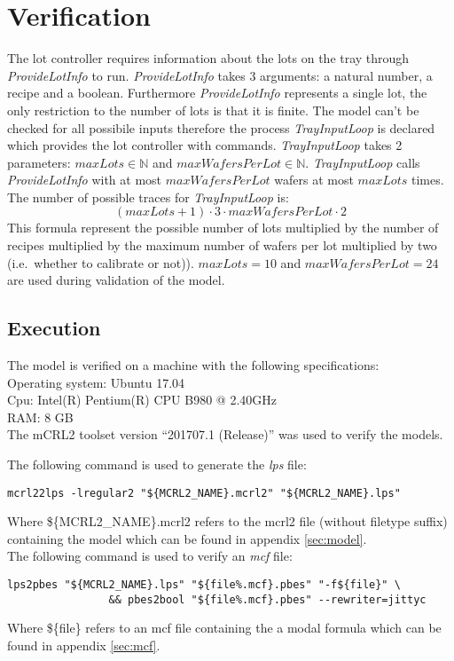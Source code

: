 \section{Verification}\label{sec:results}
The lot controller requires information about the lots on the tray through \textit{ProvideLotInfo} to run.
\textit{ProvideLotInfo} takes 3 arguments: a natural number, a recipe and a boolean.
Furthermore \textit{ProvideLotInfo} represents a single lot, the only restriction to the number of lots is that it is finite.
The model can't be checked for all possibile inputs therefore the process \textit{TrayInputLoop} is declared which provides the lot controller with  commands.
\textit{TrayInputLoop} takes 2 parameters: $\mathit{maxLots} \in \mathbb{N}$ and $\mathit{maxWafersPerLot} \in \mathbb{N}$.
\textit{TrayInputLoop} calls \textit{ProvideLotInfo} with at most $\mathit{maxWafersPerLot}$ wafers at most $\mathit{maxLots}$ times.
The number of possible traces for \textit{TrayInputLoop} is:
$$(\mathit{maxLots}+1) \cdot 3 \cdot \mathit{maxWafersPerLot} \cdot 2$$
This formula represent the possible number of lots multiplied by the number of recipes multiplied by the maximum number of wafers per lot multiplied by two (i.e.\ whether to calibrate or not)). $\mathit{maxLots} = 10$ and $\mathit{maxWafersPerLot} = 24$ are used during validation of the model.

\subsection{Execution}
The model is verified on a machine with the following specifications:\\
Operating system: Ubuntu 17.04\\
Cpu: Intel(R) Pentium(R) CPU B980 @ 2.40GHz\\
RAM: 8 GB\\

The mCRL2 toolset version ``201707.1 (Release)'' was used to verify the models.

The following command is used to generate the \textit{lps} file:\\
\begin{lstlisting}[style=sh,caption={mcf2lps}] 
mcrl22lps -lregular2 "${MCRL2_NAME}.mcrl2" "${MCRL2_NAME}.lps"
\end{lstlisting}
Where \$\{MCRL2\_NAME\}.mcrl2 refers to the mcrl2 file (without filetype suffix) containing the model which can be found in appendix \ref{sec:model}.\\
The following command is used to verify an \textit{mcf} file:\\
\begin{lstlisting}[style=sh,caption={mcf check}] 
lps2pbes "${MCRL2_NAME}.lps" "${file%.mcf}.pbes" "-f${file}" \
                && pbes2bool "${file%.mcf}.pbes" --rewriter=jittyc
\end{lstlisting}
Where \$\{file\} refers to an mcf file containing the a modal formula which can be found in appendix \ref{sec:mcf}.\\
